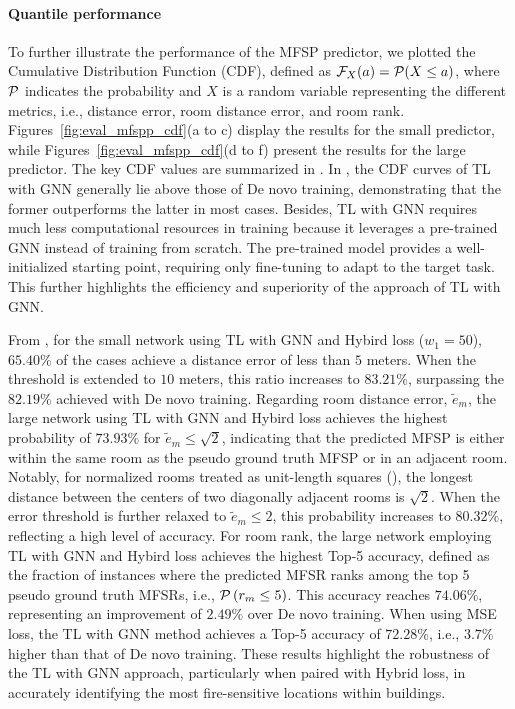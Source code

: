 \paragraph{Quantile performance}
To further illustrate the performance of the MFSP predictor, we plotted the Cumulative Distribution Function (CDF), defined as ${\cal{F}}_{X}(a)={\cal{P}}(X \le a)$, where $\cal{P}$ indicates the probability and $X$ is a random variable representing the different metrics, i.e., distance error, room distance error, and room rank. Figures~\ref{fig:eval_mfspp_cdf}(a to c) display the results for the small predictor, while Figures~\ref{fig:eval_mfspp_cdf}(d to f) present the results for the large predictor. The key CDF values are summarized in . In , the CDF curves of TL with GNN generally lie above those of De novo training, demonstrating that the former outperforms the latter in most cases. Besides, TL with GNN requires much less computational resources in training because it leverages a pre-trained GNN instead of training from scratch. The pre-trained model provides a well-initialized starting point, requiring only fine-tuning to adapt to the target task. This further highlights the efficiency and superiority of the approach of TL with GNN.

From , for the small network using TL with GNN and Hybird loss ($w_1=50$), $65.40\%$ of the cases achieve a distance error of less than $5$ meters. When the threshold is extended to $10$ meters, this ratio increases to $83.21\%$, surpassing the $82.19\%$ achieved with De novo training. Regarding room distance error, $\tilde{e}_{m}$, the large network using TL with GNN and Hybird loss achieves the highest probability of $73.93\%$ for $\tilde{e}_{m} \leq \sqrt{2}$, indicating that the predicted MFSP is either within the same room as the pseudo ground truth MFSP or in an adjacent room. Notably, for normalized rooms treated as unit-length squares (), the longest distance between the centers of two diagonally adjacent rooms is $\sqrt{2}$. When the error threshold is further relaxed to $\tilde{e}_{m} \leq 2$, this probability increases to $80.32\%$, reflecting a high level of accuracy. For room rank, the large network employing TL with GNN and Hybird loss achieves the highest Top-5 accuracy, defined as the fraction of instances where the predicted MFSR ranks among the top 5 pseudo ground truth MFSRs, i.e., ${\cal{P}}\left(r_m \leq 5\right)$. This accuracy reaches $74.06\%$, representing an improvement of $2.49\%$ over De novo training. When using MSE loss, the TL with GNN method achieves a Top-5 accuracy of $72.28\%$, i.e., $3.7\%$ higher than that of De novo training. These results highlight the robustness of the TL with GNN approach, particularly when paired with Hybrid loss, in accurately identifying the most fire-sensitive locations within buildings.

